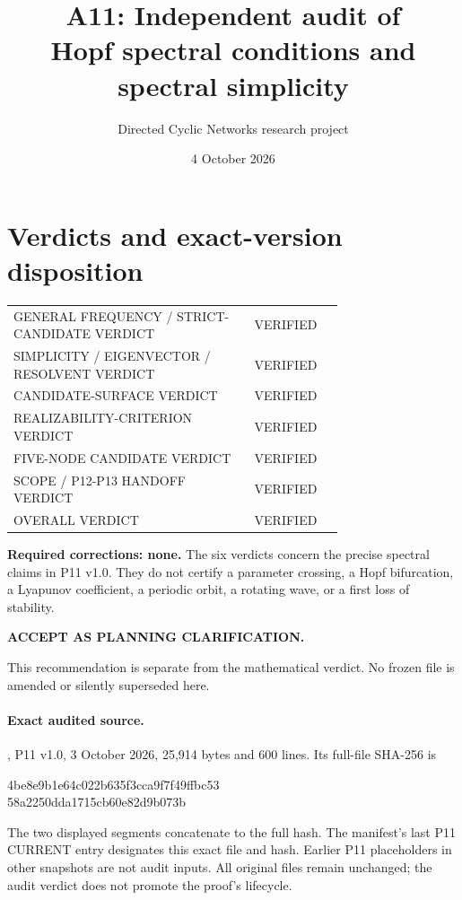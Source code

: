 \documentclass[11pt]{article}
\title{A11: Independent audit of\\Hopf spectral conditions and spectral simplicity}
\author{Directed Cyclic Networks research project}
\date{4 October 2026}
\begin{document}
\maketitle
\section{Verdicts and exact-version disposition}
\begin{center}
\begin{tabular}{p{0.73\linewidth}l}
\toprule
GENERAL FREQUENCY / STRICT-CANDIDATE VERDICT & VERIFIED\\
SIMPLICITY / EIGENVECTOR / RESOLVENT VERDICT & VERIFIED\\
CANDIDATE-SURFACE VERDICT & VERIFIED\\
REALIZABILITY-CRITERION VERDICT & VERIFIED\\
FIVE-NODE CANDIDATE VERDICT & VERIFIED\\
SCOPE / P12-P13 HANDOFF VERDICT & VERIFIED\\
\midrule OVERALL VERDICT & VERIFIED\\
\bottomrule
\end{tabular}
\end{center}
\noindent\textbf{Required corrections: none.}
The six verdicts concern the precise spectral claims in P11 v1.0. They do
not certify a parameter crossing, a Hopf bifurcation, a Lyapunov coefficient,
a periodic orbit, a rotating wave, or a first loss of stability.

\medskip{}
\noindent\textbf{ACCEPT AS PLANNING CLARIFICATION.}\par\smallskip
This recommendation is separate from the mathematical verdict. No frozen
file is amended or silently superseded here.

\paragraph{Exact audited source.}
, P11 v1.0,
3 October 2026, 25,914 bytes and 600 lines. Its full-file SHA-256 is
\begin{center}\ttfamily\small
4be8e9b1e64c022b635f3cca9f7f49ffbc53\\
58a2250dda1715cb60e82d9b073b
\end{center}
The two displayed segments concatenate to the full hash. The manifest's
last P11 CURRENT entry designates this exact file and hash. Earlier P11
placeholders in other snapshots are not audit inputs. All original files
remain unchanged; the audit verdict does not promote the proof's lifecycle.
\end{document}

